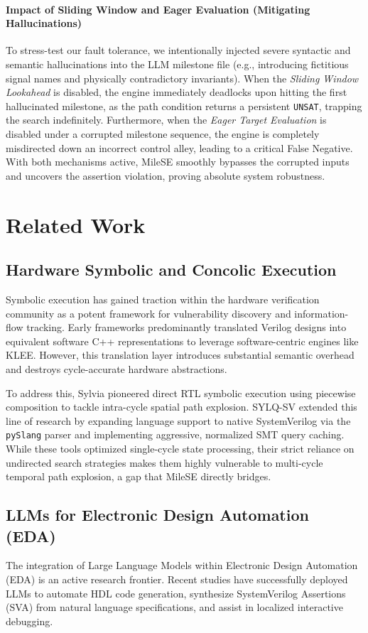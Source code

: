 \documentclass[conference]{IEEEtran}
\begin{document}
\paragraph{Impact of Sliding Window and Eager Evaluation (Mitigating Hallucinations)}
To stress-test our fault tolerance, we intentionally injected severe syntactic and semantic hallucinations into the LLM milestone file (e.g., introducing fictitious signal names and physically contradictory invariants). 
When the \textit{Sliding Window Lookahead} is disabled, the engine immediately deadlocks upon hitting the first hallucinated milestone, as the path condition returns a persistent \texttt{UNSAT}, trapping the search indefinitely. 
Furthermore, when the \textit{Eager Target Evaluation} is disabled under a corrupted milestone sequence, the engine is completely misdirected down an incorrect control alley, leading to a critical False Negative. 
With both mechanisms active, MileSE smoothly bypasses the corrupted inputs and uncovers the assertion violation, proving absolute system robustness.

\section{Related Work}
\label{sec:related}
\subsection{Hardware Symbolic and Concolic Execution}
Symbolic execution has gained traction within the hardware verification community as a potent framework for vulnerability discovery and information-flow tracking. Early frameworks predominantly translated Verilog designs into equivalent software C++ representations to leverage software-centric engines like KLEE. However, this translation layer introduces substantial semantic overhead and destroys cycle-accurate hardware abstractions. 

To address this, Sylvia pioneered direct RTL symbolic execution using piecewise composition to tackle intra-cycle spatial path explosion. SYLQ-SV extended this line of research by expanding language support to native SystemVerilog via the \texttt{pySlang} parser and implementing aggressive, normalized SMT query caching. While these tools optimized single-cycle state processing, their strict reliance on undirected search strategies makes them highly vulnerable to multi-cycle temporal path explosion, a gap that MileSE directly bridges.

\subsection{LLMs for Electronic Design Automation (EDA)}
The integration of Large Language Models within Electronic Design Automation (EDA) is an active research frontier. Recent studies have successfully deployed LLMs to automate HDL code generation, synthesize SystemVerilog Assertions (SVA) from natural language specifications, and assist in localized interactive debugging. 
\end{document}
